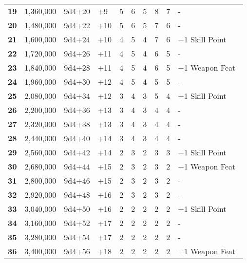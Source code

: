 \begin {table}[H]
\begin{tabularx}{\columnwidth}{>{\bfseries}cccM{.31in}M{.51in}M{.25in}M{.43in}M{.32in}M{.45in}Y}
		19 & 1,360,000 & 9d4+20 & +9 & 5 & 6 & 5 & 8 & 7 & -\\
		20 & 1,480,000 & 9d4+22 & +10 & 5 & 6 & 5 & 7 & 6 & -\\
		21 & 1,600,000 & 9d4+24 & +10 & 4 & 5 & 4 & 7 & 6 & +1 Skill Point\\
		22 & 1,720,000 & 9d4+26 & +11 & 4 & 5 & 4 & 6 & 5 & -\\
		23 & 1,840,000 & 9d4+28 & +11 & 4 & 5 & 4 & 6 & 5 & +1 Weapon Feat\\
		24 & 1,960,000 & 9d4+30 & +12 & 4 & 5 & 4 & 5 & 5 & -\\
		25 & 2,080,000 & 9d4+34 & +12 & 3 & 4 & 3 & 5 & 4 & +1 Skill Point\\
		26 & 2,200,000 & 9d4+36 & +13 & 3 & 4 & 3 & 4 & 4 & -\\
		27 & 2,320,000 & 9d4+38 & +13 & 3 & 4 & 3 & 4 & 4 & -\\
		28 & 2,440,000 & 9d4+40 & +14 & 3 & 4 & 3 & 4 & 4 & -\\
		29 & 2,560,000 & 9d4+42 & +14 & 2 & 3 & 2 & 3 & 3 & +1 Skill Point\\
		30 & 2,680,000 & 9d4+44 & +15 & 2 & 3 & 2 & 3 & 2 & +1 Weapon Feat\\
		31 & 2,800,000 & 9d4+46 & +15 & 2 & 3 & 2 & 3 & 2 & -\\
		32 & 2,920,000 & 9d4+48 & +16 & 2 & 3 & 2 & 3 & 2 & -\\
		33 & 3,040,000 & 9d4+50 & +16 & 2 & 2 & 2 & 2 & 2 & +1 Skill Point\\
		34 & 3,160,000 & 9d4+52 & +17 & 2 & 2 & 2 & 2 & 2 & -\\
		35 & 3,280,000 & 9d4+54 & +17 & 2 & 2 & 2 & 2 & 2 & -\\
		36 & 3,400,000 & 9d4+56 & +18 & 2 & 2 & 2 & 2 & 2 & +1 Weapon Feat\
  \end {tabularx}
\end {table}

